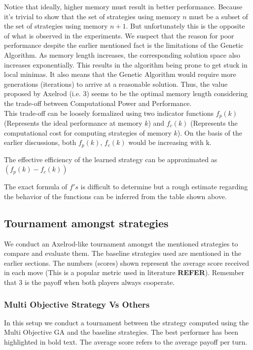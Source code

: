\documentclass[a4paper]{article}
\begin{document}
	Notice that ideally, higher memory must result in better performance. Because it's trivial to show that the set of strategies using memory $n$ must be a subset of the set of strategies using memory $n+1$. But unfortunately this is the opposite of what is observed in the experiments. We suspect that the reason for poor performance despite the earlier mentioned fact is the limitations of the Genetic Algorithm. As memory length increases, the corresponding solution space also increases exponentially. This results in the algorithm being prone to get stuck in local minimas. It also means that the Genetic Algorithm would require more generations (iterations) to arrive at a reasonable solution. Thus, the value proposed by Axelrod (i.e. 3) seems to be the optimal memory length considering the trade-off between Computational Power and Performance.\\
	
	This trade-off can be loosely formalized using two indicator functions $f_{p}(k)$ (Represents the ideal performance at memory $k$) and $f_{c}(k)$ (Represents the computational cost for computing strategies of memory $k$). On the basis of the earlier discussions, both $f_{p}(k)$, $f_{c}(k)$ would be increasing with k.
	
	\noindent
	The effective efficiency of the learned strategy can be approximated as $(f_{p}(k) - f_{c}(k))$
	 
	 The exact formula of $f's$ is difficult to determine but a rough estimate regarding the behavior of the functions can be inferred from the table shown above. 

	\subsection{Tournament amongst strategies}

	We conduct an Axelrod-like tournament amongst the mentioned strategies to compare and evaluate them. The baseline strategies used are mentioned in the earlier sections. The numbers (scores) shown represent the average score received in each move (This is a popular metric used in literature \textbf{REFER}). Remember that 3 is the payoff when both players always cooperate.

	\subsubsection{Multi Objective Strategy Vs Others}

	In this setup we conduct a tournament between the strategy computed using the Multi Objective GA and the baseline strategies. The best performer has been highlighted in bold text. The average score refers to the average payoff per turn.
\end{document}
